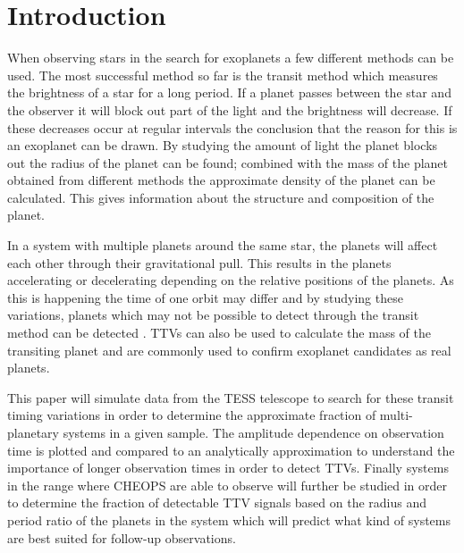 \documentclass[12pt]{report}
\begin{document}
\newpage

\setcounter{page}{1} %

\tableofcontents

\newpage

\listoffigures 

\newpage

\chapter{Introduction}
When observing stars in the search for exoplanets a few different methods can be used. The most successful method so far is the transit method which measures the brightness of a star for a long period. If a planet passes between the star and the observer it will block out part of the light and the brightness will decrease. If these decreases occur at regular intervals the conclusion that the reason for this is an exoplanet can be drawn. By studying the amount of light the planet blocks out the radius of the planet can be found; combined with the mass of the planet obtained from different methods the approximate density of the planet can be calculated. This gives information about the structure and composition of the planet.

In a system with multiple planets around the same star, the planets will affect each other through their gravitational pull. This results in the planets accelerating or decelerating depending on the relative positions of the planets. As this is happening the time of one orbit may differ and by studying these variations, planets which may not be possible to detect through the transit method can be detected \citep{2012Sci...336.1133N}. TTVs can also be used to calculate the mass of the transiting planet and are commonly used to confirm exoplanet candidates as real planets.

This paper will simulate data from the TESS telescope to search for these transit timing variations in order to determine the approximate fraction of multi-planetary systems in a given sample. The amplitude dependence on observation time is plotted and compared to an analytically approximation to understand the importance of longer observation times in order to detect TTVs. Finally systems in the range where CHEOPS are able to observe will further be studied in order to determine the fraction of detectable TTV signals based on the radius and period ratio of the planets in the system which will predict what kind of systems are best suited for follow-up observations.
\end{document}
